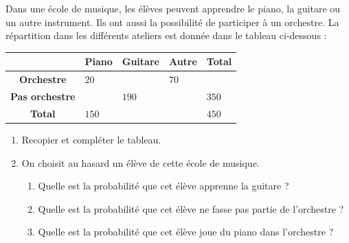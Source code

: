 \begin{exo}
	Dans une école de musique, les élèves peuvent apprendre le piano, la guitare ou un autre instrument. Ils ont aussi la possibilité de participer à un orchestre. La répartition dans les différents ateliers est donnée dans le tableau ci-dessous :

	\begin{center}
		\def\arraystretch{1.5}\small
		\begin{tabular}{|c|C{8mm}|C{12mm}|C{10mm}|C{10mm}|} \hline
			                                          & \textbf{Piano} & \textbf{Guitare} & \textbf{Autre} & \textbf{Total} \\ \hline
			\textbf{Orchestre}     & $20$                              &                                     & $70$                              &                                   \\ \hline
			\textbf{Pas orchestre} &                                   & $190$                               &                                   & $350$                             \\ \hline
			\textbf{Total}         & $150$                             &                                     &                                   & $450$                             \\ \hline
		\end{tabular}
	\end{center}

	\begin{enumerate}
		\item Recopier et compléter le tableau.
		\item On choisit au hasard un élève de cette école de musique.
		      \begin{enumerate}
			      \item Quelle est la probabilité que cet élève apprenne la guitare ?
			      \item Quelle est la probabilité que cet élève ne fasse pas partie de l'orchestre ?
			      \item Quelle est la probabilité que cet élève joue du piano dans l'orchestre ?
		      \end{enumerate}
	\end{enumerate}
\end{exo}
